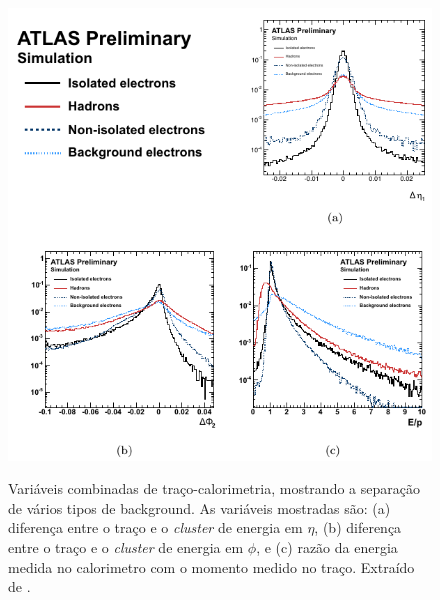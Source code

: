\begin{figure}[h!]
	\centering
	\includegraphics[width=12cm]{./textuais/identificacao/figuras/fig_3_variaveis_eletron.pdf}\\
	\caption{Variáveis combinadas de traço-calorimetria, mostrando a separação de vários tipos de background. As variáveis mostradas são: (a) diferença entre o traço e o \emph{cluster} de energia em $\eta$, (b) diferença entre o traço e o \emph{cluster} de energia em $\phi$, e (c) razão da energia medida no calorimetro com o momento medido no traço. Extraído de \cite{alison2014road}.}
	\label{fig:3T03}
\end{figure}

